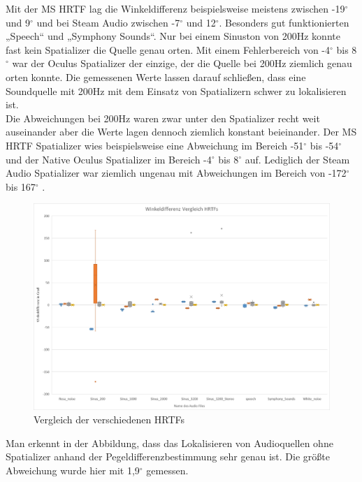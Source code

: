 \documentclass[12pt,a4paper]{article}
\begin{document}
Mit der MS HRTF lag die Winkeldifferenz beispielsweise meistens zwischen -19$^\circ$ und 9$^\circ$ und bei Steam Audio zwischen -7$^\circ$ und 12$^\circ$. Besonders gut funktionierten „Speech“ und „Symphony Sounds“. Nur bei einem Sinuston von 200Hz konnte fast kein  Spatializer die Quelle genau orten. Mit einem Fehlerbereich von -4$^\circ$ bis 8$^\circ$ war der Oculus Spatializer der einzige, der die Quelle bei 200Hz ziemlich genau orten konnte. Die gemessenen Werte lassen darauf schließen, dass eine Soundquelle mit 200Hz mit dem Einsatz von Spatializern schwer zu lokalisieren ist.\\
Die Abweichungen bei 200Hz waren zwar unter den Spatializer recht weit auseinander aber die Werte lagen dennoch ziemlich konstant beieinander. Der MS HRTF Spatializer wies beispielsweise eine Abweichung im Bereich -51$^\circ$ bis -54$^\circ$ und der Native Oculus Spatializer im Bereich -4$^\circ$ bis 8$^\circ$ auf. Lediglich der Steam Audio Spatializer war ziemlich ungenau mit Abweichungen im Bereich von -172$^\circ$ bis 167$^\circ$ .\newpage
\begin{figure}[!h]
\centering
\includegraphics[scale=0.4]{Vergleich_HRTFs}
\caption{Vergleich der verschiedenen HRTFs}
\end{figure}

Man erkennt in der Abbildung, dass das Lokalisieren von Audioquellen ohne Spatializer anhand der Pegeldifferenzbestimmung sehr genau ist. Die größte Abweichung wurde hier mit 1,9$^\circ$ gemessen.



\end{document}
